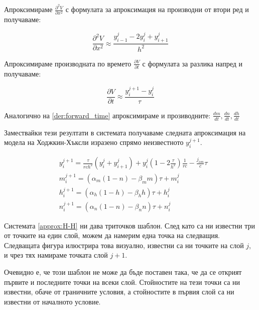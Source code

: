 \documentclass{article}
\begin{document}
    Апроксимираме $\frac{\partial^2 V}{\partial x^2}$ с формулата за апроксимация на производни от втори ред и получаваме:

    \begin{equation}\label{der:mid_space}
        \frac{\partial^2 V}{\partial x^2} \approx \frac{y_{i-1}^j - 2y_i^j + y_{i+1}^j}{h^2}
    \end{equation}
    
    Апроксимираме производната по времето $\frac{\partial V}{\partial t}$ с формулата за разлика напред и получаваме:

    \begin{equation}\label{der:forward_time}
        \frac{\partial V}{\partial t} \approx \frac{y_i^{j+1} - y_i^j}{\tau}
    \end{equation}

    Аналогично на \eqref{der:forward_time} апроксимираме и прозиводните: $\frac{dm}{dt}, \frac{dn}{dt}, \frac{dh}{dt}$

    Замествайки тези резултати в системата получаваме следната апроксимация на модела на Ходжкин-Хъксли изразено спрямо неизвестното
    $y_i^{j+1}$.

    \begin{equation}\label{approx:H-H}
        \begin{aligned}
            &y_i^{j+1} = \frac{\tau}{rch^2}\left(y_i^j +y_{i+1}^j\right) + y_i^j\left(1 - 2\frac{\tau}{h^2}\right)\frac{1}{rc}
            - \frac{j_{ion}}{c}\tau\\
            &m_i^{j+1} = \left(\alpha_m(1-n) - \beta_mm\right)\tau + m_i^j\\
            &h_i^{j+1} = \left(\alpha_h(1-h) - \beta_hh\right)\tau + h_i^j\\
            &n_i^{j+1} = \left(\alpha_n(1-n) - \beta_nn\right)\tau + n_i^j
    \end{aligned}
    \end{equation}

    Системата \eqref{approx:H-H} ни дава триточков шаблон. След като са ни известни три от точките на един слой, можем да намерим една точка
    на следващия. Следващата фигура илюстрира това визуално, известни са ни точките на слой $j$, и чрез тях намираме точката слой $j+1$.
    \begin{figure}[h!]
        \begin{center}
        
        \caption{}
        \end{center}
    \end{figure}

    Очевидно е, че този шаблон не може да бъде поставен така, че да се открият първите и последните точки на всеки слой. Стойностите на тези
    точки са ни известни, обаче от граничните условия, а стойностите в първия слой са ни известни от началното условие.
\end{document}
